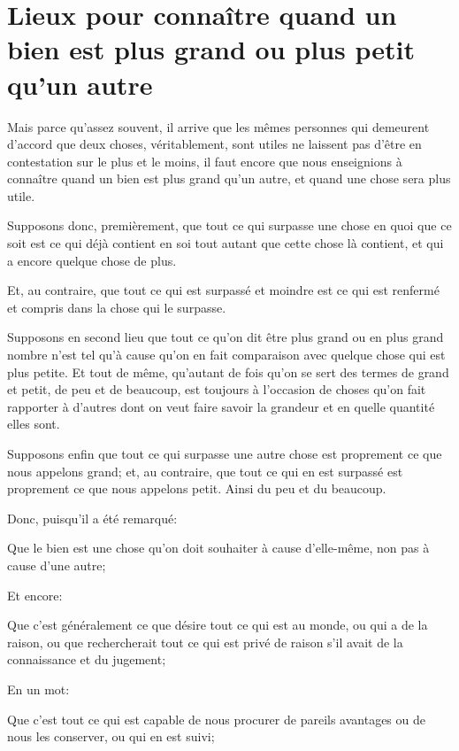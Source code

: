 
\section{Lieux pour connaître quand un bien est plus grand ou plus petit qu'un autre}

Mais parce qu'assez souvent, il arrive que les mêmes personnes qui demeurent d'accord que deux choses,
véritablement, sont utiles ne laissent pas d'être en contestation sur le plus et le moins, il faut encore
que nous enseignions à connaître quand un bien est plus grand qu'un autre, et quand une chose sera plus
utile. 

Supposons donc, premièrement, que tout ce qui surpasse une chose en quoi que ce soit est ce qui déjà contient
en soi tout autant que cette chose là contient, et qui a encore quelque chose de plus.

Et, au contraire, que tout ce qui est surpassé et moindre est ce qui est renfermé et compris dans la chose
qui le surpasse.

Supposons en second lieu que tout ce qu'on dit être plus grand ou en plus grand nombre n'est tel qu'à cause
qu'on en fait comparaison avec quelque chose qui est plus petite. Et tout de même, qu'autant de fois qu'on
se sert des termes de grand et petit, de peu et de beaucoup, est toujours à l'occasion de choses qu'on fait
rapporter à d'autres dont on veut faire savoir la grandeur et en quelle quantité elles sont.

Supposons enfin que tout ce qui surpasse une autre chose est proprement ce que nous appelons grand; et, au
contraire, que tout ce qui en est surpassé est proprement ce que nous appelons petit. Ainsi du peu et du
beaucoup.

\bigbreak

Donc, puisqu'il a été remarqué:

\begin{emphpar}
	Que le bien est une chose qu'on doit souhaiter à cause d'elle-même, non pas à cause d'une autre;
\end{emphpar}

Et encore:

\begin{emphpar}
	Que c'est généralement ce que désire tout ce qui est au monde, ou qui a de la raison, ou que rechercherait
	tout ce qui est privé de raison s'il avait de la connaissance et du jugement;
\end{emphpar}

En un mot:

\begin{emphpar}
	Que c'est tout ce qui est capable de nous procurer de pareils avantages ou de nous les conserver, ou qui
	en est suivi;
\end{emphpar}

